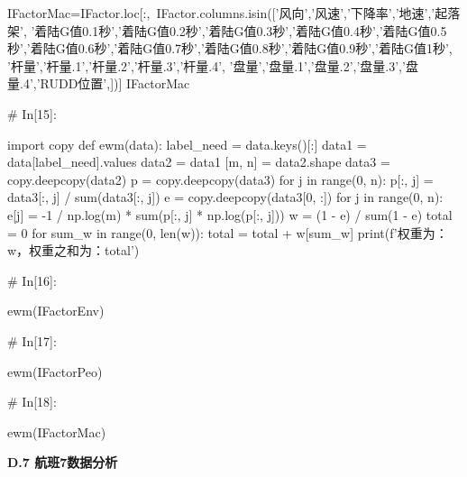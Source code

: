 \documentclass{MathorCupModeling}
\begin{document}
\begin{python}
IFactorMac=IFactor.loc[:,~IFactor.columns.isin(['风向','风速','下降率','地速','起落架',
                          '着陆G值0.1秒','着陆G值0.2秒','着陆G值0.3秒','着陆G值0.4秒','着陆G值0.5秒','着陆G值0.6秒','着陆G值0.7秒','着陆G值0.8秒','着陆G值0.9秒','着陆G值1秒',
                          '杆量','杆量.1','杆量.2','杆量.3','杆量.4',
                          '盘量','盘量.1','盘量.2','盘量.3','盘量.4','RUDD位置',])]
IFactorMac


# In[15]:


import copy
def ewm(data):
    label_need = data.keys()[:]
    data1 = data[label_need].values
    data2 = data1
    [m, n] = data2.shape
    data3 = copy.deepcopy(data2)
    p = copy.deepcopy(data3)
    for j in range(0, n):
        p[:, j] = data3[:, j] / sum(data3[:, j])
    e = copy.deepcopy(data3[0, :])
    for j in range(0, n):
        e[j] = -1 / np.log(m) * sum(p[:, j] * np.log(p[:, j]))
    w = (1 - e) / sum(1 - e)
    total = 0
    for sum_w in range(0, len(w)):
        total = total + w[sum_w]
    print(f'权重为：{w}，权重之和为：{total}')


# In[16]:


ewm(IFactorEnv)


# In[17]:


ewm(IFactorPeo)


# In[18]:


ewm(IFactorMac)


\end{python}
\newpage
\textbf{D.7 航班7数据分析}
\end{document}

